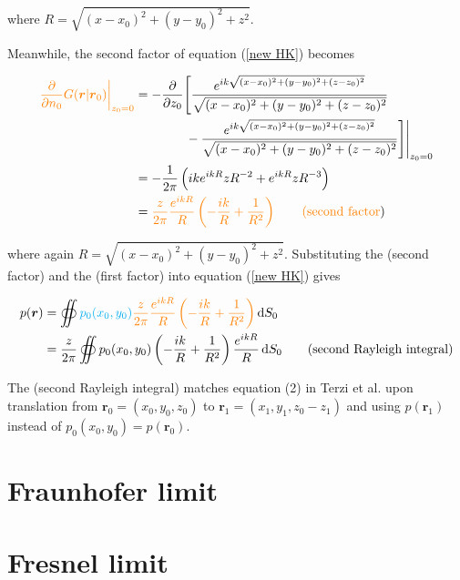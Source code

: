 \documentclass[12pt]{article}%
\begin{document}
\noindent where $R = \sqrt{(x-x_0)^2 + (y-y_0)^2 + z^2}$. 


Meanwhile, the \color{orange} second factor \color{black} of equation (\ref{new HK}) becomes

\begin{align*}
\color{orange} \frac{\partial}{\partial n_0} G(\boldsymbol r|\boldsymbol r_0)\bigg\rvert_{z_0=0}\color{black}&= -\frac{\partial}{\partial z_0} \Bigg\lbrack\frac{e^{ik\sqrt{(x-x_0)^2+(y-y_0)^2 +(z-z_0)^2}}}{\sqrt{(x-x_0)^2+(y-y_0)^2 +(z-z_0)^2}}\\  
&\text{\space \space \space \space \space \space \space \space \space \space \space \space }- \frac{e^{ik\sqrt{(x-x_0)^2+(y-y_0)^2 +(z-z_0)^2}}}{\sqrt{(x-x_0)^2+(y-y_0)^2 +(z-z_0)^2}}\Bigg\rbrack\Bigg\rvert_{z_0=0} \\ 
&=  -\frac{1}{2\pi}\del{ik e^{ikR}z R^{-2} + e^{ikR} z R^{-3} }\\
&= \color{orange} \frac{z}{2\pi}\frac{e^{ikR}}{R}\del{-\frac{ik}{R} + \frac{1}{R^2}} \tag{\color{orange} second factor\color{black}}
\end{align*}



\noindent where again \color{orange}  $R = \sqrt{(x-x_0)^2 + (y-y_0)^2 + z^2}$\color{black}. Substituting the (\color{orange}second factor\color{black})   and the (\color{cyan}first factor\color{black})  into equation (\ref{new HK}) gives

\begin{align*}
p(\boldsymbol{r}) &=  \oiint \color{cyan} p_0 (x_0,y_0) \color{black} \color{orange} \frac{z}{2\pi}\frac{e^{ikR}}{R}\del{-\frac{ik}{R} + \frac{1}{R^2}}\color{black}  \dif S_0  \\
&= \frac{z}{2\pi} \oiint p_0(x_0, y_0)  \del{-\frac{ik}{R} + \frac{1}{R^2}}\frac{e^{ikR}}{R} \dif S_0 \tag{second Rayleigh integral}
\end{align*}

\noindent The (second Rayleigh integral) matches equation (2) in Terzi et al. upon translation from $\boldsymbol r_0 = (x_0,y_0,z_0)$ to $\boldsymbol r_1 = (x_1,y_1,z_0-z_1)$ and using $p(\boldsymbol r_1)$ instead of $p_0(x_0,y_0) = p(\boldsymbol r_0)$.



\section{Fraunhofer limit}\label{Fraunhofer}

\section{Fresnel limit}\label{Fresnel}
\end{document}
